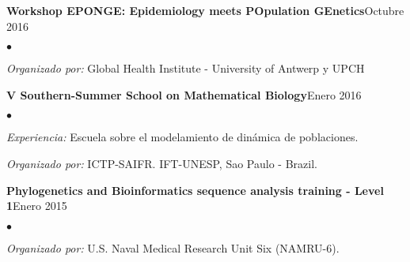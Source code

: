 \documentclass[margin,line]{res}
\newenvironment{list2}{
	\begin{list}{$\bullet$}{%
			\setlength{\itemsep}{0in}
			\setlength{\parsep}{0in} \setlength{\parskip}{0in}
			\setlength{\topsep}{0in} \setlength{\partopsep}{0in}
			\setlength{\leftmargin}{0.2in}}}{\end{list}}
\begin{document}
\begin{resume}
		{\bf Workshop EPONGE: Epidemiology meets POpulation GEnetics}\hfill {Octubre 2016}\\
		\vspace*{-.1in}
		\begin{list2} %
			\item \textit{Organizado por:} Global Health Institute - University of Antwerp y UPCH %
		\end{list2}

		
		{\bf V Southern-Summer School on Mathematical Biology}\hfill {Enero 2016}\\
		\vspace*{-.1in}%
		\begin{list2} %
			\item \textit{Experiencia:} Escuela sobre el modelamiento de dinámica de poblaciones.
			\item \textit{Organizado por:} ICTP-SAIFR. IFT-UNESP, Sao Paulo - Brazil.
		\end{list2}
		
		{\bf Phylogenetics and Bioinformatics sequence analysis training - Level 1}\hfill {Enero 2015}\\
		\vspace*{-.1in}
		\begin{list2} %
			\item \textit{Organizado por:} U.S. Naval Medical Research Unit Six (NAMRU-6).%
		\end{list2}
		
		

\end{resume}
\end{document}
